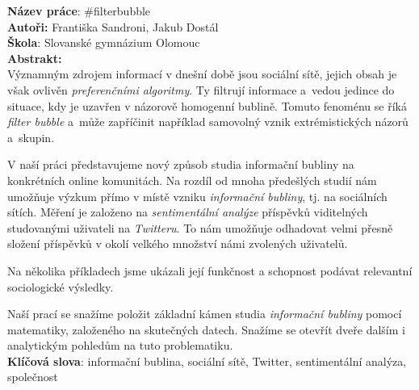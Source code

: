 \documentclass[12pt, a4paper]{article}
\begin{document}
\noindent \textbf{Název práce}: \#filterbubble\\
\textbf{Autoři:} Františka Sandroni, Jakub Dost\'al\\
\textbf{Škola}: Slovanské gymnázium Olomouc\\
\textbf{Abstrakt:}\\
Významným zdrojem informací v dnešní době jsou sociální sítě, jejich obsah je však ovlivěn \textit{preferenčními algoritmy}. Ty filtrují informace a~vedou jedince do situace, kdy je uzavřen v názorově homogenní bublině. Tomuto fenoménu se říká \textit{filter bubble} a~může zapříčinit například samovolný vznik extrémistických názorů a~skupin.

V naší práci představujeme nový způsob studia informační bubliny na kon\-krét\-ních online komunitách. Na rozdíl od mnoha předešlých studií nám umožňuje výzkum přímo v místě vzniku \textit{informační bubliny}, tj. na sociálních sítích. Měření je založeno na \textit{sentimentální analýze} příspěvků viditelných studovanými uživateli na \textit{Twitteru}. To nám umožňuje odhadovat velmi přesně složení příspěvků v okolí velkého množství námi zvolených uživatelů.

Na několika příkladech jsme ukázali její funkčnost a schopnost podávat relevantní sociologické výsledky.

Naší prací se snažíme položit základní kámen studia \textit{informační bubliny} pomocí matematiky, založeného na skutečných datech. Snažíme se otevřít dveře dalším i analytickým pohledům na tuto problematiku.\\
\textbf{Klíčová slova}: informační bublina, sociální sítě, Twitter, sentimentální a\-na\-lý\-za, společnost
\end{document}
